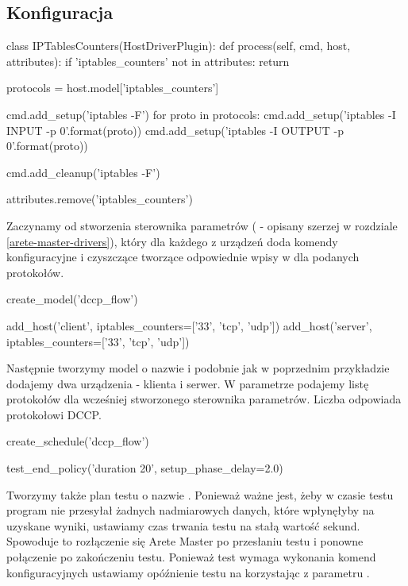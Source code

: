 \documentclass[00-praca-magisterska.tex]{subfiles}
\begin{document}
\subsection{Konfiguracja}

\begin{pythoncode}
  class IPTablesCounters(HostDriverPlugin):
      def process(self, cmd, host, attributes):
          if 'iptables_counters' not in attributes:
              return 

          protocols = host.model['iptables_counters']

          cmd.add_setup('iptables -F')
          for proto in protocols:
              cmd.add_setup('iptables -I INPUT -p {0}'.format(proto))
              cmd.add_setup('iptables -I OUTPUT -p {0}'.format(proto))

          cmd.add_cleanup('iptables -F')

          attributes.remove('iptables_counters')
\end{pythoncode}

Zaczynamy od stworzenia sterownika parametrów ( - opisany
szerzej w rozdziale \ref{arete-master-drivers}), który dla każdego z urządzeń doda
komendy konfiguracyjne i czyszczące tworzące odpowiednie wpisy w 
dla podanych protokołów.

\begin{pythoncode}
  create_model('dccp_flow')

  add_host('client', iptables_counters=['33', 'tcp', 'udp'])
  add_host('server', iptables_counters=['33', 'tcp', 'udp'])
\end{pythoncode}

Następnie tworzymy model o nazwie  i podobnie jak w poprzednim
przykładzie dodajemy dwa urządzenia - klienta i serwer. W parametrze
 podajemy listę protokołów dla wcześniej stworzonego
sterownika parametrów. Liczba  odpowiada protokołowi DCCP.

\begin{pythoncode}
  create_schedule('dccp_flow')

  test_end_policy('duration 20', setup_phase_delay=2.0)
\end{pythoncode}

Tworzymy także plan testu o nazwie . Ponieważ ważne jest, żeby
w czasie testu program nie przesyłał żadnych nadmiarowych danych, które
wpłynęłyby na uzyskane wyniki, ustawiamy czas trwania testu na stałą wartość
 sekund. Spowoduje to rozłączenie się Arete Master po przesłaniu testu
i ponowne połączenie po zakończeniu testu. Ponieważ test wymaga wykonania komend
konfiguracyjnych ustawiamy opóźnienie testu na  korzystając z
parametru .
\end{document}
